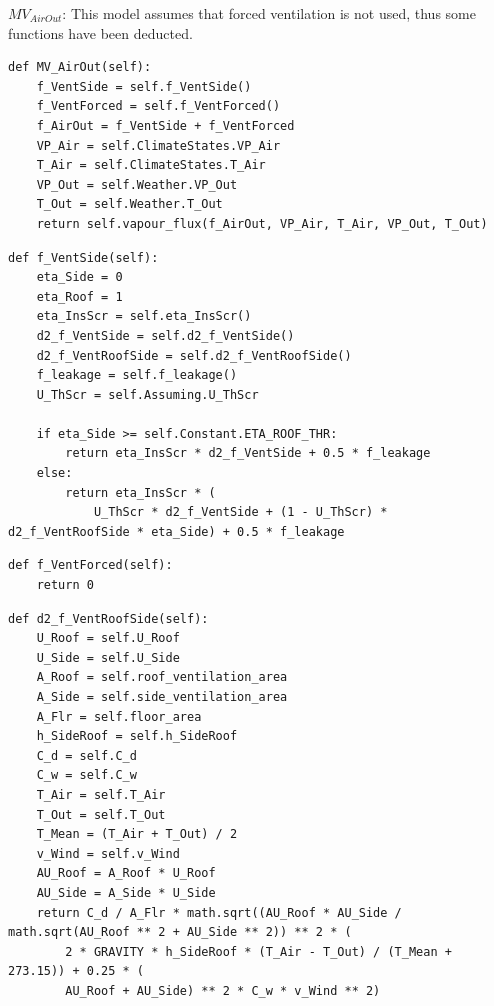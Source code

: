 \documentclass[a4paper]{article}
\numberwithin{equation}{section}
\begin{document}
\(MV_{AirOut}\):
This model assumes that forced ventilation is not used, thus some functions have been deducted.
\begin{mdframed}[leftline=false,rightline=false,backgroundcolor=magenta!10,nobreak=true]
  \begin{verbatim}
def MV_AirOut(self):
    f_VentSide = self.f_VentSide()
    f_VentForced = self.f_VentForced()
    f_AirOut = f_VentSide + f_VentForced
    VP_Air = self.ClimateStates.VP_Air
    T_Air = self.ClimateStates.T_Air
    VP_Out = self.Weather.VP_Out
    T_Out = self.Weather.T_Out
    return self.vapour_flux(f_AirOut, VP_Air, T_Air, VP_Out, T_Out)
  \end{verbatim}
\end{mdframed}
\begin{mdframed}[leftline=false,rightline=false,backgroundcolor=magenta!10,nobreak=true]
  \begin{verbatim}
def f_VentSide(self):
    eta_Side = 0
    eta_Roof = 1
    eta_InsScr = self.eta_InsScr()
    d2_f_VentSide = self.d2_f_VentSide()
    d2_f_VentRoofSide = self.d2_f_VentRoofSide()
    f_leakage = self.f_leakage()
    U_ThScr = self.Assuming.U_ThScr

    if eta_Side >= self.Constant.ETA_ROOF_THR:
        return eta_InsScr * d2_f_VentSide + 0.5 * f_leakage
    else:
        return eta_InsScr * (
            U_ThScr * d2_f_VentSide + (1 - U_ThScr) * d2_f_VentRoofSide * eta_Side) + 0.5 * f_leakage
  \end{verbatim}
\end{mdframed}
\begin{mdframed}[leftline=false,rightline=false,backgroundcolor=magenta!10,nobreak=true]
  \begin{verbatim}
def f_VentForced(self):
    return 0
  \end{verbatim}
\end{mdframed}
\begin{mdframed}[leftline=false,rightline=false,backgroundcolor=magenta!10,nobreak=true]
  \begin{verbatim}
def d2_f_VentRoofSide(self):
    U_Roof = self.U_Roof
    U_Side = self.U_Side
    A_Roof = self.roof_ventilation_area
    A_Side = self.side_ventilation_area
    A_Flr = self.floor_area
    h_SideRoof = self.h_SideRoof
    C_d = self.C_d
    C_w = self.C_w
    T_Air = self.T_Air
    T_Out = self.T_Out
    T_Mean = (T_Air + T_Out) / 2
    v_Wind = self.v_Wind
    AU_Roof = A_Roof * U_Roof
    AU_Side = A_Side * U_Side
    return C_d / A_Flr * math.sqrt((AU_Roof * AU_Side / math.sqrt(AU_Roof ** 2 + AU_Side ** 2)) ** 2 * (
        2 * GRAVITY * h_SideRoof * (T_Air - T_Out) / (T_Mean + 273.15)) + 0.25 * (
        AU_Roof + AU_Side) ** 2 * C_w * v_Wind ** 2)
  \end{verbatim}
\end{mdframed}
\end{document}
